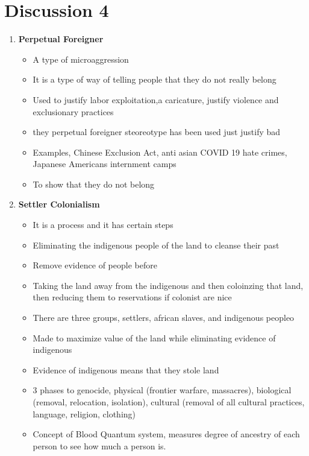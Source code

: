 \documentclass{article}
\begin{document}
  \section*{Discussion 4}
  \begin{enumerate}
    \item \textbf{Perpetual Foreigner}
      \begin{itemize}
        \item A type of microaggression
        \item It is a type of way of telling people
          that they do not really belong
        \item Used to justify labor exploitation,a caricature, 
          justify violence and exclusionary practices
        \item they perpetual foreigner steoreotype has been used
          just justify bad
        \item Examples, Chinese Exclusion Act, anti asian COVID 19 hate crimes,
          Japanese Americans internment camps
        \item To show that they do not belong
      \end{itemize}
    \item \textbf{Settler Colonialism}
      \begin{itemize}
        \item It is a process and it has certain steps
        \item Eliminating the indigenous people of the land to cleanse their past
        \item Remove evidence of people before
        \item Taking the land away from the indigenous and then coloinzing that land, then
          reducing them to reservations if colonist are nice
        \item There are three groups, settlers, african slaves, and indigenous peopleo
        \item Made to maximize value of the land while eliminating evidence of indigenous
        \item Evidence of indigenous means that they stole land
        \item 3 phases to genocide, physical (frontier warfare, massacres), biological 
          (removal, relocation, isolation), cultural
          (removal of all cultural practices, language, religion, clothing)
        \item Concept of Blood Quantum system, measures degree of ancestry
          of each person to see how much a person is.


\end{itemize}
\end{enumerate}
\end{document}
